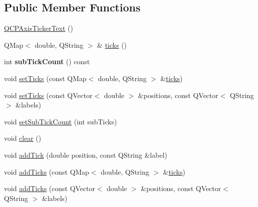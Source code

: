 \subsection*{Public Member Functions}
\begin{DoxyCompactItemize}
\item 
\hyperlink{classQCPAxisTickerText_a1d7243b1256c1aa9d1d5b99b2e84e648}{Q\+C\+P\+Axis\+Ticker\+Text} ()
\item 
Q\+Map$<$ double, Q\+String $>$ \& \hyperlink{classQCPAxisTickerText_ac84622a6bb4f2a98474e185ecaf3189a}{ticks} ()
\item 
\mbox{\label{classQCPAxisTickerText_a5c3c59e8fdf4c96568dd50d4a653e791}} 
int {\bfseries sub\+Tick\+Count} () const
\item 
void \hyperlink{classQCPAxisTickerText_a8cdf1f21940f1f53f5e3d30b2c74f5cf}{set\+Ticks} (const Q\+Map$<$ double, Q\+String $>$ \&\hyperlink{classQCPAxisTickerText_ac84622a6bb4f2a98474e185ecaf3189a}{ticks})
\item 
void \hyperlink{classQCPAxisTickerText_a686f38f358a0cf2d9309c84c22581d9b}{set\+Ticks} (const Q\+Vector$<$ double $>$ \&positions, const Q\+Vector$<$ Q\+String $>$ \&labels)
\item 
void \hyperlink{classQCPAxisTickerText_a8cfa50c51183c90186892eeef978d571}{set\+Sub\+Tick\+Count} (int sub\+Ticks)
\item 
void \hyperlink{classQCPAxisTickerText_a21826d2fcd9a25c194d34d4f67aa1460}{clear} ()
\item 
void \hyperlink{classQCPAxisTickerText_a3362873a48614e6d446c193548cb85e3}{add\+Tick} (double position, const Q\+String \&label)
\item 
void \hyperlink{classQCPAxisTickerText_aba34051300eecaefbedb2df8feff2d45}{add\+Ticks} (const Q\+Map$<$ double, Q\+String $>$ \&\hyperlink{classQCPAxisTickerText_ac84622a6bb4f2a98474e185ecaf3189a}{ticks})
\item 
void \hyperlink{classQCPAxisTickerText_a8140c730e20b0050e1b702af3db00b2e}{add\+Ticks} (const Q\+Vector$<$ double $>$ \&positions, const Q\+Vector$<$ Q\+String $>$ \&labels)
\end{DoxyCompactItemize}
